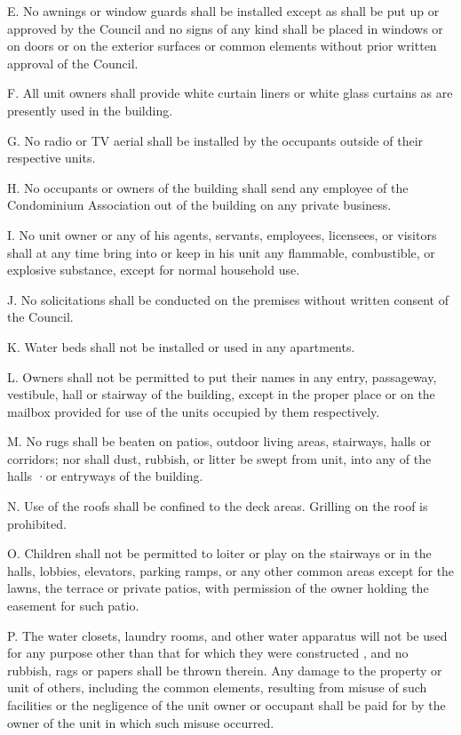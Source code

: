 \documentclass[
  14pt,
]{book}
\begin{document}
E. No awnings or window guards shall be installed except as shall be put up or approved by the Council and no signs of any kind shall be placed in windows or on doors or on the exterior surfaces or common elements without prior written approval of the Council.

F. All unit owners shall provide white curtain liners or white glass curtains as are presently used in the building.

G. No radio or TV aerial shall be installed by the occupants outside of their respective units.

H. No occupants or owners of the building shall send any employee of the Condominium Association out of the building on any private business.

I. No unit owner or any of his agents, servants, employees, licensees, or visitors shall at any time bring into or keep in his unit any flammable, combustible, or explosive substance, except for normal household use.

J. No solicitations shall be conducted on the premises without written consent of the Council.

K. Water beds shall not be installed or used in any apartments.

L. Owners shall not be permitted to put their names in any entry, passageway, vestibule, hall or stairway of the building, except in the proper place or on the mailbox provided for use of the units occupied by them respectively.

M. No rugs shall be beaten on patios, outdoor living areas, stairways, halls or corridors; nor shall dust, rubbish, or litter be swept from unit, into any of the halls ·or entryways of the building.

N. Use of the roofs shall be confined to the deck areas. Grilling on the roof is prohibited.

O. Children shall not be permitted to loiter or play on the stairways or in the halls, lobbies, elevators, parking ramps, or any other common areas except for the lawns, the terrace or private patios, with permission of the owner holding the easement for such patio.

P. The water closets, laundry rooms, and other water apparatus will not be used for any purpose other than that for which they were constructed , and no rubbish, rags or papers shall be thrown therein. Any damage to the property or unit of others, including the common elements, resulting from misuse of such facilities or the negligence of the unit owner or occupant shall be paid for by the owner of the unit in which such misuse occurred.
\end{document}
